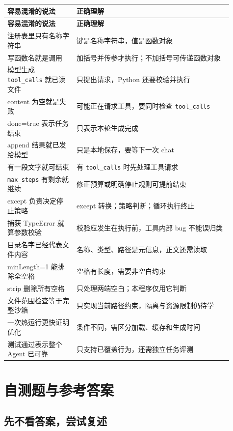 \documentclass[UTF8,zihao=-4,fontset=fandol]{ctexart}
\begin{document}
{\small\setlength{\tabcolsep}{4pt}
\renewcommand{\arraystretch}{1.25}
\begin{longtable}{>{\raggedright\arraybackslash}p{0.28\linewidth}>{\raggedright\arraybackslash}p{0.63\linewidth}}
\toprule
\textbf{容易混淆的说法} & \textbf{正确理解} \\
\midrule\endfirsthead
\toprule
\textbf{容易混淆的说法} & \textbf{正确理解} \\
\midrule\endhead
\bottomrule\endfoot
注册表里只有名称字符串 & 键是名称字符串，值是函数对象 \\
写函数名就是调用 & 加括号并传参才执行；不加括号可传递函数对象 \\
模型生成 \nolinkurl{tool_calls} 就已读文件 & 只提出请求，Python 还要校验并执行 \\
content 为空就是失败 & 可能正在请求工具，要同时检查 \nolinkurl{tool_calls} \\
done=true 表示任务结束 & 只表示本轮生成完成 \\
append 结果就已发给模型 & 只是本地保存，要等下一次 chat \\
有一段文字就可结束 & 有 \nolinkurl{tool_calls} 时先处理工具请求 \\
\nolinkurl{max_steps} 有剩余就继续 & 修正预算或明确停止规则可提前结束 \\
except 负责决定停止策略 & except 转换；策略判断；循环执行终止 \\
捕获 TypeError 就算参数校验 & 校验应发生在执行前，工具内部 bug 不能误归类 \\
目录名字已经代表文件内容 & 名称、类型、路径是元信息，正文还需读取 \\
minLength=1 能排除全空格 & 空格有长度，需要非空白约束 \\
strip 删除所有空格 & 只处理两端空白；本程序仅用它判断 \\
文件范围检查等于完整沙箱 & 只实现当前路径约束，隔离与资源限制仍待学 \\
一次热运行更快证明优化 & 条件不同，需区分加载、缓存和生成时间 \\
测试通过表示整个 Agent 已可靠 & 只支持已覆盖行为，还需独立任务评测 \\
\end{longtable}}

\section{自测题与参考答案}

\subsection{先不看答案，尝试复述}
\end{document}
